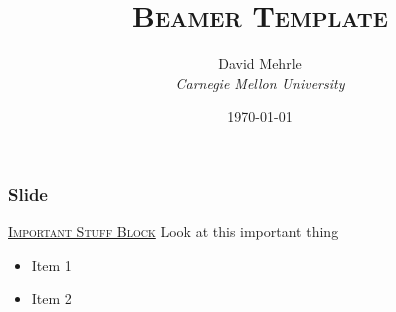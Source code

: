 \documentclass[xcolor=x11names]{beamer}
\newcommand{\vspacer}{\vspace*{1em}}
\begin{document}
	
	{ 


	\begin{frame}
		\title{\textsc{Beamer Template}}
		\author{David Mehrle \\ \textit{Carnegie Mellon University}}
		\date{\today}
		\maketitle

	\end{frame}}



	\begin{frame}
		\frametitle{Slide} 
	
		\begin{block}{\underline{\textsc{Important Stuff Block}}}
			Look at this important thing 
		\end{block}
		
		\vspacer
		
		\begin{itemize}
			\setlength{\itemsep}{1em}
			
			\item Item 1
			
			\item Item 2
		
		\end{itemize} 
		
		
	
	\end{frame}
	
\end{document}
